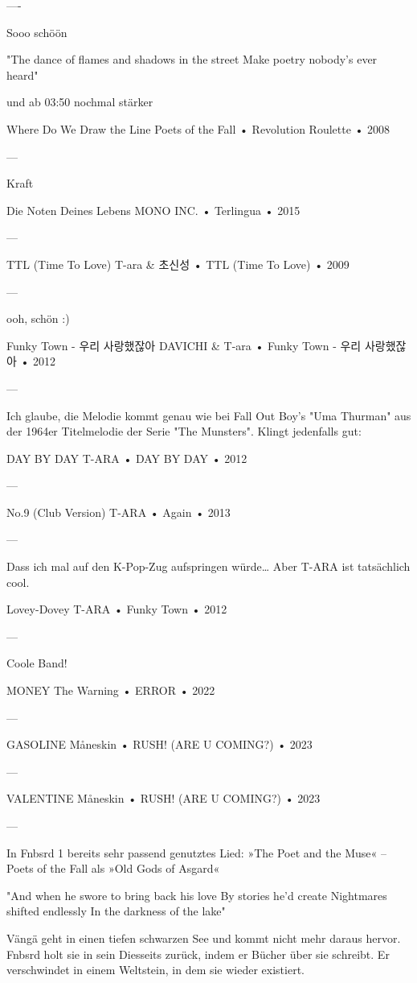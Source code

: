 —-

Sooo schöön

"The dance of flames and shadows in the street
Make poetry nobody's ever heard"

und ab 03:50 nochmal stärker

Where Do We Draw the Line
Poets of the Fall
 •
Revolution Roulette
 •
2008

—

Kraft

Die Noten Deines Lebens
MONO INC.
 •
Terlingua
 •
2015

—

TTL (Time To Love)
T-ara
 &
초신성
 •
TTL (Time To Love)
 •
2009

—

ooh, schön :)

Funky Town - 우리 사랑했잖아
DAVICHI & T-ara
 •
Funky Town - 우리 사랑했잖아
 •
2012

—

Ich glaube, die Melodie kommt genau wie bei Fall Out Boy's "Uma Thurman" aus der 1964er Titelmelodie der Serie "The Munsters". Klingt jedenfalls gut:

DAY BY DAY
T-ARA
 •
DAY BY DAY
 •
2012


—

No.9 (Club Version)
T-ARA
 •
Again
 •
2013

—

Dass ich mal auf den K-Pop-Zug aufspringen würde… Aber T-ARA ist tatsächlich cool.

Lovey-Dovey
T-ARA
 •
Funky Town
 •
2012

—

Coole Band!

MONEY
The Warning
 •
ERROR
 • 2022

—

GASOLINE
Måneskin
 •
RUSH! (ARE U COMING?)
 • 2023

—

VALENTINE
Måneskin
 •
RUSH! (ARE U COMING?)
 • 2023

—

In Fnbsrd 1 bereits sehr passend genutztes Lied:
»The Poet and the Muse« – Poets of the Fall als »Old Gods of Asgard«

"And when he swore to bring back his love
By stories he’d create
Nightmares shifted endlessly
In the darkness of the lake"

Vängä geht in einen tiefen schwarzen See und kommt nicht mehr daraus hervor.
Fnbsrd holt sie in sein Diesseits zurück, indem er Bücher über sie schreibt.
Er verschwindet in einem Weltstein, in dem sie wieder existiert.


